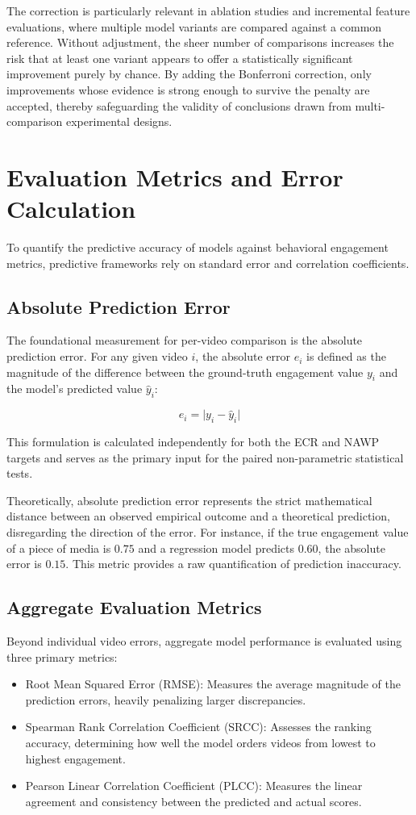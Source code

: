 The correction is particularly relevant in ablation studies and incremental feature evaluations, where multiple model variants are compared against a common reference. Without adjustment, the sheer number of comparisons increases the risk that at least one variant appears to offer a statistically significant improvement purely by chance. By adding the Bonferroni correction, only improvements whose evidence is strong enough to survive the penalty are accepted, thereby safeguarding the validity of conclusions drawn from multi-comparison experimental designs.

\section{Evaluation Metrics and Error Calculation}
To quantify the predictive accuracy of models against behavioral engagement metrics, predictive frameworks rely on standard error and correlation coefficients.

\subsection{Absolute Prediction Error}
The foundational measurement for per-video comparison is the absolute prediction error. For any given video $i$, the absolute error $e_i$ is defined as the magnitude of the difference between the ground-truth engagement value $y_i$ and the model's predicted value $\hat{y}_i$:

$$e_i=\vert{}y_i-\hat{y}_i\vert{}$$

This formulation is calculated independently for both the ECR and NAWP targets and serves as the primary input for the paired non-parametric statistical tests.

Theoretically, absolute prediction error represents the strict mathematical distance between an observed empirical outcome and a theoretical prediction, disregarding the direction of the error. For instance, if the true engagement value of a piece of media is $0.75$ and a regression model predicts $0.60$, the absolute error is $0.15$. This metric provides a raw quantification of prediction inaccuracy.



\subsection{Aggregate Evaluation Metrics}
Beyond individual video errors, aggregate model performance is evaluated using three primary metrics:
\begin{itemize}
    \item Root Mean Squared Error (RMSE): Measures the average magnitude of the prediction errors, heavily penalizing larger discrepancies.
    \item Spearman Rank Correlation Coefficient (SRCC): Assesses the ranking accuracy, determining how well the model orders videos from lowest to highest engagement.
    \item Pearson Linear Correlation Coefficient (PLCC): Measures the linear agreement and consistency between the predicted and actual scores.
\end{itemize}


